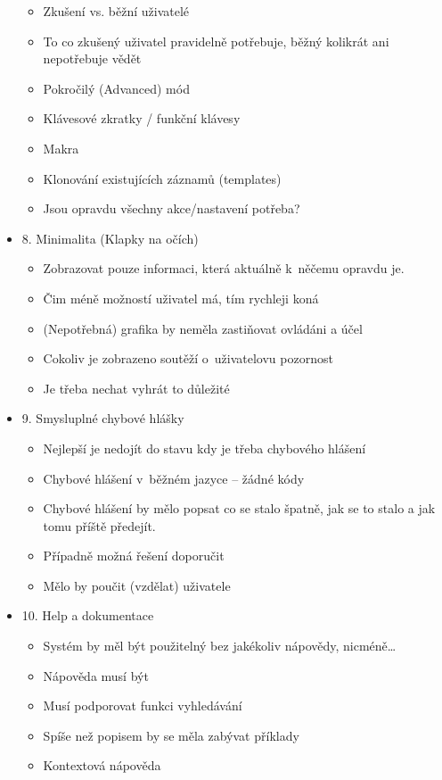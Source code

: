 \begin{itemize}
        \begin{itemize}
            \item Zkušení vs. běžní uživatelé
            \item To co zkušený uživatel pravidelně potřebuje, běžný kolikrát ani nepotřebuje vědět
            \item Pokročilý (Advanced) mód
            \item Klávesové zkratky / funkční klávesy
            \item Makra
            \item Klonování existujících záznamů (templates)
            \item Jsou opravdu všechny akce/nastavení potřeba?
        \end{itemize}
    \item 8. Minimalita (Klapky na očích)
        \begin{itemize}
            \item Zobrazovat pouze informaci, která aktuálně k~něčemu opravdu je.
            \item Čim méně možností uživatel má, tím rychleji koná
            \item (Nepotřebná) grafika by neměla zastiňovat ovládáni a účel
            \item Cokoliv je zobrazeno soutěží o~uživatelovu pozornost
            \item Je třeba nechat vyhrát to důležité
        \end{itemize}
    \item 9. Smysluplné chybové hlášky
        \begin{itemize}
            \item Nejlepší je nedojít do stavu kdy je třeba chybového hlášení
            \item Chybové hlášení v~běžném jazyce – žádné kódy
            \item Chybové hlášení by mělo popsat co se stalo špatně, jak se to stalo a jak tomu příště předejít.
            \item Případně možná řešení doporučit
            \item Mělo by poučit (vzdělat) uživatele
        \end{itemize}
    \item 10. Help a dokumentace
        \begin{itemize}
            \item Systém by měl být použitelný bez jakékoliv nápovědy, nicméně…
            \item Nápověda musí být
            \item Musí podporovat funkci vyhledávání
            \item Spíše než popisem by se měla zabývat příklady
            \item Kontextová nápověda
        \end{itemize}
\end{itemize}

